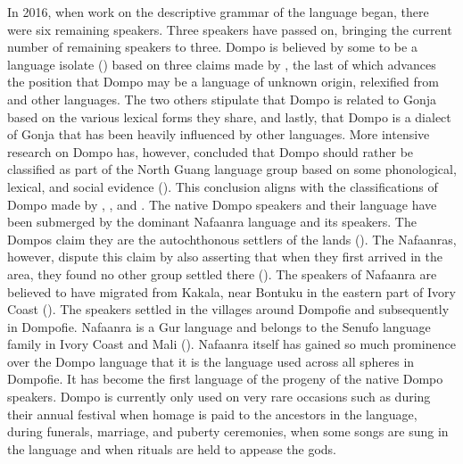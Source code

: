 \documentclass[output=paper,colorlinks,citecolor=brown]{langscibook}
\begin{document}
In 2016, when work on the descriptive grammar of the language began, there were six remaining speakers. Three speakers have passed on, bringing the current number of remaining speakers to three. Dompo is believed by some to be a language isolate (\cite{Blench2007, Dimmendaal2011}) based on three claims made by \citet{Blench2007}, the last of which advances the position that Dompo may be a language of unknown origin, relexified from  and other languages. The two others stipulate that Dompo is related to Gonja based on the various lexical forms they share, and lastly, that Dompo is a dialect of Gonja that has been heavily influenced by other languages. More intensive research on Dompo has, however, concluded that Dompo should rather be classified as part of the North Guang language group based on some phonological, lexical, and social evidence (\cite{Manu-Barfo2019, Manu-Barfo2020}). This conclusion aligns with the classifications of Dompo made by \citet{Güldemann2018}, \citet{Painter1967}, and  \citet{Ethnologue21}. The native Dompo speakers and their language have been submerged by the dominant Na\-faanra language and its speakers. The Dompos claim they are the autochthonous settlers of the lands (\cite{Goody1964, Stahl91}). The Nafaanras, however, dispute this claim by also asserting that when they first arrived in the area, they found no other group settled there (\cite{Owusuh1976}). The speakers of Nafaanra are believed to have migrated from Kakala, near Bontuku in the eastern part of Ivory Coast (\cite{Ameyaw65}). The speakers settled in the villages around Dompofie and subsequently in Dompofie. Nafaanra is a Gur language and belongs to the Senufo language family in Ivory Coast and Mali (\cite{Jordan1980, Ethnologue21}). Nafaanra itself has gained so much prominence over the Dompo language that it is the language used across all spheres in Dompofie. It has become the first language of the progeny of the native Dompo speakers. Dompo is currently only used on very rare occasions such as during their annual festival when homage is paid to the ancestors in the language, during funerals, marriage, and puberty ceremonies, when some songs are sung in the language and when rituals are held to appease the gods.  
\end{document}
